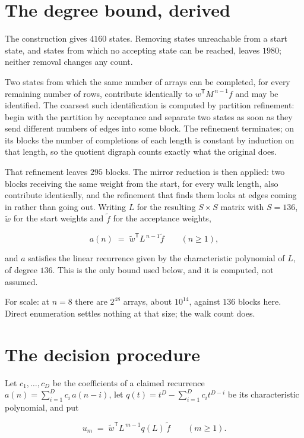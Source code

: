\documentclass[11pt]{article}
\theoremstyle{definition}
\begin{document}
\section{The degree bound, derived}

The construction gives $4160$ states. Removing states unreachable from a start state, and states from which no accepting state can be reached, leaves $1980$; neither removal changes any count.

Two states from which the same number of arrays can be completed, for every remaining number of rows, contribute identically to $w^{\mathsf T}M^{\,n-1}f$ and may be identified. The coarsest such identification is computed by partition refinement: begin with the partition by acceptance and separate two states as soon as they send different numbers of edges into some block. The refinement terminates; on its blocks the number of completions of each length is constant by induction on that length, so the quotient digraph counts exactly what the original does.

That refinement leaves $295$ blocks. The mirror reduction is then applied: two blocks receiving the same weight from the start, for every walk length, also contribute identically, and the refinement that finds them looks at edges coming in rather than going out. Writing $L$ for the resulting $S \times S$ matrix with $S = 136$, $\tilde w$ for the start weights and $\tilde f$ for the acceptance weights,

\[a(n) \;=\; \tilde w^{\mathsf T} L^{\,n-1} \tilde f \qquad (n \ge 1),\]

and $a$ satisfies the linear recurrence given by the characteristic polynomial of $L$, of degree $136$. This is the only bound used below, and it is computed, not assumed.

For scale: at $n = 8$ there are $2^{48}$ arrays, about $10^{14}$, against $136$ blocks here. Direct enumeration settles nothing at that size; the walk count does.

\section{The decision procedure}

Let $c_1,\dots,c_D$ be the coefficients of a claimed recurrence $a(n) = \sum_{i=1}^{D} c_i\,a(n-i)$, let $q(t) = t^{D} - \sum_{i=1}^{D} c_i t^{D-i}$ be its characteristic polynomial, and put

\[u_m \;=\; \tilde w^{\mathsf T} L^{\,m-1} q(L)\,\tilde f \qquad (m \ge 1).\]
\end{document}
